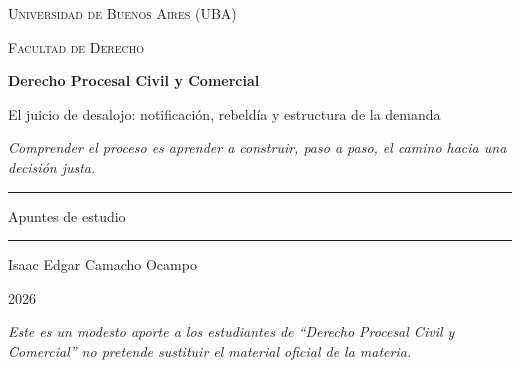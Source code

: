 \documentclass[12pt,oneside]{book}
\newcommand{\universidad}{Universidad de Buenos Aires (UBA)}
\newcommand{\facultad}{Facultad de Derecho}
\newcommand{\materia}{Derecho Procesal Civil y Comercial}
\newcommand{\titulo}{El juicio de desalojo: notificación, rebeldía y estructura de la demanda}
\newcommand{\autor}{Isaac Edgar Camacho Ocampo}
\newcommand{\anio}{2026}
\begin{document}
\begin{titlepage}

\thispagestyle{empty}

\begin{center}

\vspace*{1cm}

{\large \textsc{\universidad}}

\vspace{0.2cm}

{\large \textsc{\facultad}}

\vspace{3cm}

{\Huge \textbf{\materia}}

\vspace{1cm}

{\LARGE \titulo}

\vspace{0.8cm}

\textit{Comprender el proceso es aprender a construir, paso a paso, el camino hacia una decisión justa.}

\vspace{1.2cm}

\rule{0.70\textwidth}{0.5pt}

\vspace{0.5cm}

{\large Apuntes de estudio}

\vspace{0.5cm}

\rule{0.70\textwidth}{0.5pt}

\vfill

{\large \autor}

\vspace{0.3cm}

{\large \anio}

\end{center}

\vfill

\begin{flushleft}
\textit{Este es un modesto aporte a los estudiantes de ``Derecho Procesal Civil y Comercial'' no pretende sustituir el material oficial de la materia.}
\end{flushleft}

\end{titlepage}

\tableofcontents
\end{document}
